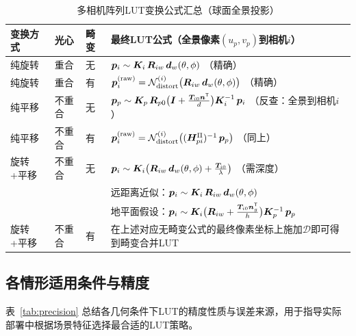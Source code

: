 \begin{table}[H]
\centering
\caption{多相机阵列LUT变换公式汇总（球面全景投影）}
\label{tab:summary-multi}
\small
\begin{tabularx}{\textwidth}{p{2.0cm}p{2.8cm}p{2.0cm}X}
\toprule
\textbf{变换方式} & \textbf{光心} & \textbf{畸变} & \textbf{最终LUT公式（全景像素$(u_p,v_p)$到相机$i$）} \\
\midrule
纯旋转
  & 重合
  & 无
  & $\bm{p}_i \sim \bm{K}_i\,\bm{R}_{iw}\,\bm{d}_w(\theta,\phi)$ \quad（精确）\\[6pt]

纯旋转
  & 重合
  & 有
  & $\bm{p}_i^{\text{(raw)}} = \mathcal{N}_{\text{distort}}^{(i)}\bigl(\bm{R}_{iw}\,\bm{d}_w(\theta,\phi)\bigr)$ \quad（精确）\\[6pt]

纯平移
  & 不重合
  & 无
  & $\bm{p}_p \sim \bm{K}_p\,\bm{R}_{p0}\bigl(\bm{I} + \frac{\bm{T}_{i0}\bm{n}^{\mathsf{T}}}{d}\bigr)\bm{K}_i^{-1}\,\bm{p}_i$ \quad（反查：全景到相机$i$）\\[6pt]

纯平移
  & 不重合
  & 有
  & $\bm{p}_i^{\text{(raw)}} = \mathcal{N}_{\text{distort}}^{(i)}\bigl((\bm{H}_{pi}^{\Pi})^{-1}\,\bm{p}_p\bigr)$ \quad（同上）\\[6pt]

旋转+平移
  & 不重合
  & 无
  & $\bm{p}_i \sim \bm{K}_i\bigl(\bm{R}_{iw}\,\bm{d}_w(\theta,\phi) + \frac{\bm{T}_{i0}}{\lambda}\bigr)$ \quad（需深度）\\[6pt]
  & & & 远距离近似：$\bm{p}_i \sim \bm{K}_i\,\bm{R}_{iw}\,\bm{d}_w(\theta,\phi)$\\[6pt]
  & & & 地平面假设：$\bm{p}_i \sim \bm{K}_i\bigl(\bm{R}_{iw} + \frac{\bm{T}_{i0}\bm{n}_g^{\mathsf{T}}}{h}\bigr)\bm{K}_p^{-1}\,\bm{p}_p$\\[6pt]

旋转+平移
  & 不重合
  & 有
  & 在上述对应无畸变公式的最终像素坐标上施加$\mathcal{D}$即可得到畸变合并LUT \\
\bottomrule
\end{tabularx}
\end{table}

\subsection{各情形适用条件与精度}
\label{sec:applicability}

表~\ref{tab:precision} 总结各几何条件下LUT的精度性质与误差来源，用于指导实际部署中根据场景特征选择最合适的LUT策略。


